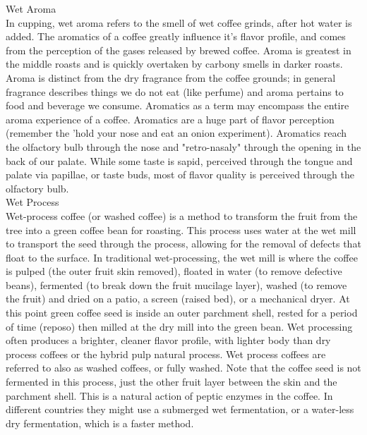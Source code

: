 \documentclass[10pt,twoside,footinclude=true,headinclude=true]{scrbook} %
\begin{document}
\begin{multicols}{2}
\medskip
{\smallcaps \small Wet Aroma}\\
In cupping, wet aroma refers to the smell of wet coffee grinds, after hot water is added. The aromatics of a coffee greatly influence it's flavor profile, and comes from the perception of the gases released by brewed coffee. Aroma is greatest in the middle roasts and is quickly overtaken by carbony smells in darker roasts. Aroma is distinct from the dry fragrance from the coffee grounds; in general fragrance describes things we do not eat (like perfume) and aroma pertains to food and beverage we consume. Aromatics as a term may encompass the entire aroma experience of a coffee. Aromatics are a huge part of flavor perception (remember the 'hold your nose and eat an onion experiment). Aromatics reach the olfactory bulb through the nose and "retro-nasaly" through the opening in the back of our palate. While some taste is sapid, perceived through the tongue and palate via papillae, or taste buds, most of flavor quality is perceived through the olfactory bulb.\\
\medskip
{\smallcaps \small Wet Process}\\
Wet-process coffee (or washed coffee) is a method to transform the fruit from the tree into a green coffee bean for roasting. This process uses water at the wet mill to transport the seed through the process, allowing for the removal of defects that float to the surface. In traditional wet-processing, the wet mill is where the coffee is pulped (the outer fruit skin removed), floated in water (to remove defective beans), fermented (to break down the fruit mucilage layer), washed (to remove the fruit) and dried on a patio, a screen (raised bed), or a mechanical dryer. At this point green coffee seed is inside an outer parchment shell, rested for a period of time (reposo) then milled at the dry mill into the green bean. Wet processing often produces a brighter, cleaner flavor profile, with lighter body than dry process coffees or the hybrid pulp natural process. Wet process coffees are referred to also as washed coffees, or fully washed. Note that the coffee seed is not fermented in this process, just the other fruit layer between the skin and the parchment shell. This is a natural action of peptic enzymes in the coffee. In different countries they might use a submerged wet fermentation, or a water-less dry fermentation, which is a faster method.\\

\end{multicols}
\end{document}

